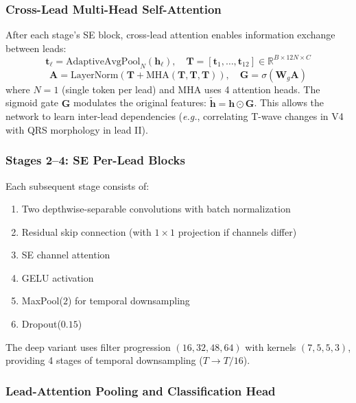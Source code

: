 \documentclass[11pt,a4paper]{article}
\newcommand{\eg}{\textit{e.g.}}
\begin{document}
\subsubsection{Cross-Lead Multi-Head Self-Attention}

After each stage's SE block, cross-lead attention enables information exchange between leads:
\begin{equation}
\mathbf{t}_\ell = \text{AdaptiveAvgPool}_{N}(\mathbf{h}_\ell), \quad
\mathbf{T} = [\mathbf{t}_1, \ldots, \mathbf{t}_{12}] \in \mathbb{R}^{B \times 12N \times C}
\end{equation}
\begin{equation}
\mathbf{A} = \text{LayerNorm}\!\left(\mathbf{T} + \text{MHA}(\mathbf{T}, \mathbf{T}, \mathbf{T})\right), \quad
\mathbf{G} = \sigma\!\left(\mathbf{W}_g \mathbf{A}\right)
\end{equation}
where $N{=}1$ (single token per lead) and $\text{MHA}$ uses 4 attention heads. The sigmoid gate $\mathbf{G}$ modulates the original features: $\tilde{\mathbf{h}} = \mathbf{h} \odot \mathbf{G}$. This allows the network to learn inter-lead dependencies (\eg, correlating T-wave changes in V4 with QRS morphology in lead II).

\subsubsection{Stages 2--4: SE Per-Lead Blocks}

Each subsequent stage consists of:
\begin{enumerate}[nosep]
  \item Two depthwise-separable convolutions with batch normalization
  \item Residual skip connection (with $1\times1$ projection if channels differ)
  \item SE channel attention
  \item GELU activation
  \item MaxPool($2$) for temporal downsampling
  \item Dropout($0.15$)
\end{enumerate}

The deep variant uses filter progression $(16, 32, 48, 64)$ with kernels $(7, 5, 5, 3)$, providing 4 stages of temporal downsampling ($T \to T/16$).

\subsubsection{Lead-Attention Pooling and Classification Head}
\end{document}
